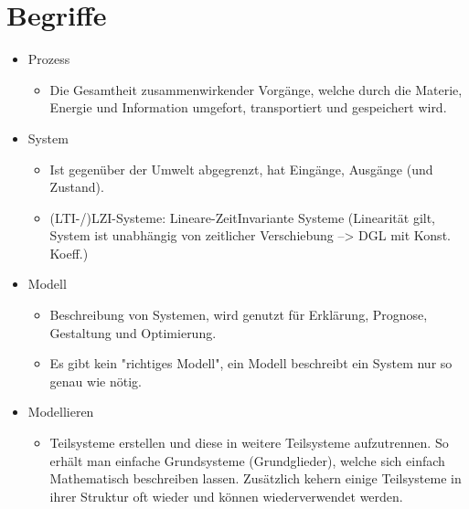 \documentclass[margin=normal]{tex/hsrzf}
\begin{document}
\section{Begriffe}
\begin{itemize}
  \item Prozess
        \begin{itemize}
          \item Die Gesamtheit zusammenwirkender Vorgänge, welche durch
                die Materie, Energie und Information
                umgefort, transportiert und gespeichert wird.
        \end{itemize}

  \item System
        \begin{itemize}
          \item Ist gegenüber der Umwelt abgegrenzt, hat Eingänge,
                Ausgänge (und Zustand).
          \item (LTI-/)LZI-Systeme: Lineare-ZeitInvariante Systeme 
          (Linearität gilt, System ist unabhängig von zeitlicher Verschiebung 
          --> DGL mit Konst. Koeff.)
        \end{itemize}

  \item Modell
        \begin{itemize}
          \item Beschreibung von Systemen, wird genutzt für
                Erklärung, Prognose, Gestaltung und Optimierung.
          \item Es gibt kein "richtiges Modell",
                ein Modell beschreibt ein System nur so genau wie nötig.
        \end{itemize}
  \item Modellieren
        \begin{itemize}
          \item Teilsysteme erstellen und diese
                in weitere Teilsysteme aufzutrennen.
                So erhält man einfache Grundsysteme (Grundglieder),
                welche sich einfach Mathematisch beschreiben lassen.
                Zusätzlich kehern einige Teilsysteme in ihrer
                Struktur oft wieder und können wiederverwendet werden.


\end{itemize}
\end{itemize}
\end{document}

